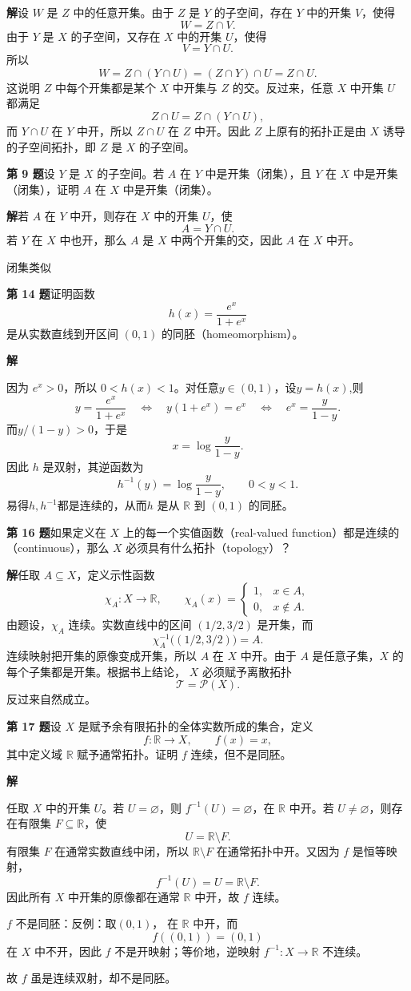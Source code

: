 \documentclass[UTF8,a4paper,11pt,fontset=windows]{ctexart}
\newcommand{\R}{\mathbb R}
\newcommand{\problem}[1]{\par\addvspace{10pt}\textbf{第 #1 题}\quad}
\begin{document}
\textbf{解}设 $W$ 是 $Z$ 中的任意开集。由于 $Z$ 是 $Y$ 的子空间，存在 $Y$ 中的开集 $V$，使得
\[
  W=Z\cap V.
\]
由于 $Y$ 是 $X$ 的子空间，又存在 $X$ 中的开集 $U$，使得
\[
  V=Y\cap U.
\]
所以
\[
  W=Z\cap(Y\cap U)=(Z\cap Y)\cap U=Z\cap U.
\]
这说明 $Z$ 中每个开集都是某个 $X$ 中开集与 $Z$ 的交。反过来，任意 $X$ 中开集 $U$ 都满足
\[
  Z\cap U=Z\cap(Y\cap U),
\]
而 $Y\cap U$ 在 $Y$ 中开，所以 $Z\cap U$ 在 $Z$ 中开。因此 $Z$ 上原有的拓扑正是由 $X$ 诱导的子空间拓扑，即 $Z$ 是 $X$ 的子空间。

\problem{9}设 $Y$ 是 $X$ 的子空间。若 $A$ 在 $Y$ 中是开集（闭集），且 $Y$ 在 $X$ 中是开集（闭集），证明 $A$ 在 $X$ 中是开集（闭集）。

\textbf{解}若 $A$ 在 $Y$ 中开，则存在 $X$ 中的开集 $U$，使
\[
  A=Y\cap U.
\]
若 $Y$ 在 $X$ 中也开，那么 $A$ 是 $X$ 中两个开集的交，因此 $A$ 在 $X$ 中开。

闭集类似

\problem{14}证明函数
\[
  h(x)=\frac{e^x}{1+e^x}
\]
是从实数直线到开区间 $(0,1)$ 的同胚（homeomorphism）。

\textbf{解}

因为 $e^x>0$，所以 $0<h(x)<1$。对任意$y\in(0,1)$，设$y=h(x)$,则
\[
  y=\frac{e^x}{1+e^x}
  \quad\Longleftrightarrow\quad
  y(1+e^x)=e^x
  \quad\Longleftrightarrow\quad
  e^x=\frac{y}{1-y}.
\]
而$y/(1-y)>0$，于是
\[
  x=\log\frac{y}{1-y}.
\]
因此 $h$ 是双射，其逆函数为
\[
  h^{-1}(y)=\log\frac{y}{1-y},\qquad 0<y<1.
\]
易得$h,h^{-1}$都是连续的，从而$h$ 是从 $\R$ 到 $(0,1)$ 的同胚。

\problem{16}如果定义在 $X$ 上的每一个实值函数（real-valued function）都是连续的（continuous），那么 $X$ 必须具有什么拓扑（topology）？

\textbf{解}任取 $A\subseteq X$，定义示性函数
\[
  \chi_A:X\longrightarrow\R,
  \qquad
  \chi_A(x)=
  \begin{cases}
    1,&x\in A,\\
    0,&x\notin A.
  \end{cases}
\]
由题设，$\chi_A$ 连续。实数直线中的区间 $(1/2,3/2)$ 是开集，而
\[
  \chi_A^{-1}\bigl((1/2,3/2)\bigr)=A.
\]
连续映射把开集的原像变成开集，所以 $A$ 在 $X$ 中开。由于 $A$ 是任意子集，$X$ 的每个子集都是开集。根据书上结论， $X$ 必须赋予离散拓扑
\[
  \mathcal T=\mathcal P(X).
\]
反过来自然成立。

\problem{17}设 $X$ 是赋予余有限拓扑的全体实数所成的集合，定义
\[
  f:\mathbb R\longrightarrow X,\qquad f(x)=x,
\]
其中定义域 $\mathbb R$ 赋予通常拓扑。证明 $f$ 连续，但不是同胚。

\textbf{解}

任取 $X$ 中的开集 $U$。若 $U=\varnothing$，则 $f^{-1}(U)=\varnothing$，在 $\R$ 中开。若 $U\neq\varnothing$，则存在有限集 $F\subseteq\R$，使
\[
  U=\R\setminus F.
\]
有限集 $F$ 在通常实数直线中闭，所以 $\R\setminus F$ 在通常拓扑中开。又因为 $f$ 是恒等映射，
\[
  f^{-1}(U)=U=\R\setminus F.
\]
因此所有 $X$ 中开集的原像都在通常 $\R$ 中开，故 $f$ 连续。

 $f$ 不是同胚：反例：取$(0,1)，$ 在 $\R$ 中开，而
\[
  f((0,1))=(0,1)
\]
在 $X$ 中不开，因此 $f$ 不是开映射；等价地，逆映射 $f^{-1}:X\to\R$ 不连续。

故 $f$ 虽是连续双射，却不是同胚。

\vfill
\end{document}
